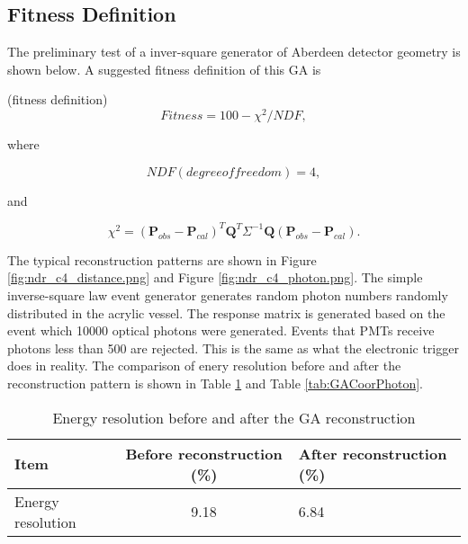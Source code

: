 \subsection{Fitness Definition}

The preliminary test of a inver-square generator of Aberdeen
detector geometry is shown below. A suggested fitness definition of this GA is


(fitness definition)
\begin{equation}
\label{fitness}
Fitness = 100 - \chi^{2}/NDF,
\end{equation}


where


\begin{equation}
\label{eq:fitnessNDF}
NDF(degree of freedom) = 4,
\end{equation}


and


\begin{equation}
\label{eq:fitnessChi}
\chi^{2} = (\mathbf{P}_{obs} - \mathbf{P}_{cal})^T\mathbf{Q}^T\Sigma^{-1}\mathbf{Q}(\mathbf{P}_{obs} - \mathbf{P}_{cal}).
\end{equation}

%
%
%
%
%
%

The typical reconstruction patterns are shown in Figure \ref{fig:ndr_c4_distance.png} and Figure \ref{fig:ndr_c4_photon.png}.
The simple inverse-square law event generator generates random photon numbers randomly distributed in the acrylic vessel.
The response matrix is generated based on the event which 10000 optical photons were generated.
Events that PMTs receive photons less than 500 are rejected. This is the same as what the electronic trigger does in reality.
The comparison of enery resolution before and after the reconstruction pattern is shown in Table \ref{tab:GAISSim} and Table \ref{tab:GACoorPhoton}.



\begin{table}
\centering
\caption{Energy resolution before and after the GA reconstruction}
\label{tab:GAISSim}
\begin{tabular}{lcp{5.0cm}}
\hline
Item & Before reconstruction (\%) & After reconstruction (\%) \\
\hline
\hline
Energy resolution & 9.18 & 6.84 \\
\hline
\end{tabular}
\end{table}


